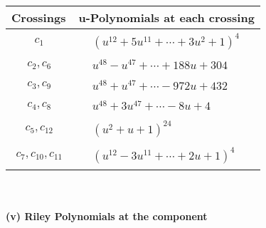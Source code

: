 \documentclass[1p]{elsarticle_modified}
\theoremstyle{definition}
\begin{document}
\begin{tabular}{m{50pt}|m{274pt}}
Crossings & \hspace{64pt}u-Polynomials at each crossing \\
\hline $$\begin{aligned}c_{1}\end{aligned}$$&$\begin{aligned}
&(u^{12}+5 u^{11}+\cdots+3 u^2+1)^{4}
\end{aligned}$\\
\hline $$\begin{aligned}c_{2},c_{6}\end{aligned}$$&$\begin{aligned}
&u^{48}- u^{47}+\cdots+188 u+304
\end{aligned}$\\
\hline $$\begin{aligned}c_{3},c_{9}\end{aligned}$$&$\begin{aligned}
&u^{48}+u^{47}+\cdots-972 u+432
\end{aligned}$\\
\hline $$\begin{aligned}c_{4},c_{8}\end{aligned}$$&$\begin{aligned}
&u^{48}+3 u^{47}+\cdots-8 u+4
\end{aligned}$\\
\hline $$\begin{aligned}c_{5},c_{12}\end{aligned}$$&$\begin{aligned}
&(u^2+u+1)^{24}
\end{aligned}$\\
\hline $$\begin{aligned}c_{7},c_{10},c_{11}\end{aligned}$$&$\begin{aligned}
&(u^{12}-3 u^{11}+\cdots+2 u+1)^{4}
\end{aligned}$\\
\hline
\end{tabular}\\~\\
\newpage\renewcommand{\arraystretch}{1}
\flushleft \textbf{(v) Riley Polynomials at the component}\newline \\
\end{document}
